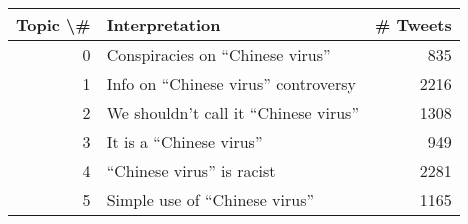 \begin{tabular}{rlr}
\toprule
 Topic \textbackslash \# &                          Interpretation &  \# Tweets \\
\midrule
        0 &       Conspiracies on ``Chinese virus'' &       835 \\
        1 &   Info on ``Chinese virus'' controversy &      2216 \\
        2 &  We shouldn't call it ``Chinese virus'' &      1308 \\
        3 &               It is a ``Chinese virus'' &       949 \\
        4 &             ``Chinese virus'' is racist &      2281 \\
        5 &         Simple use of ``Chinese virus'' &      1165 \\
\bottomrule
\end{tabular}
